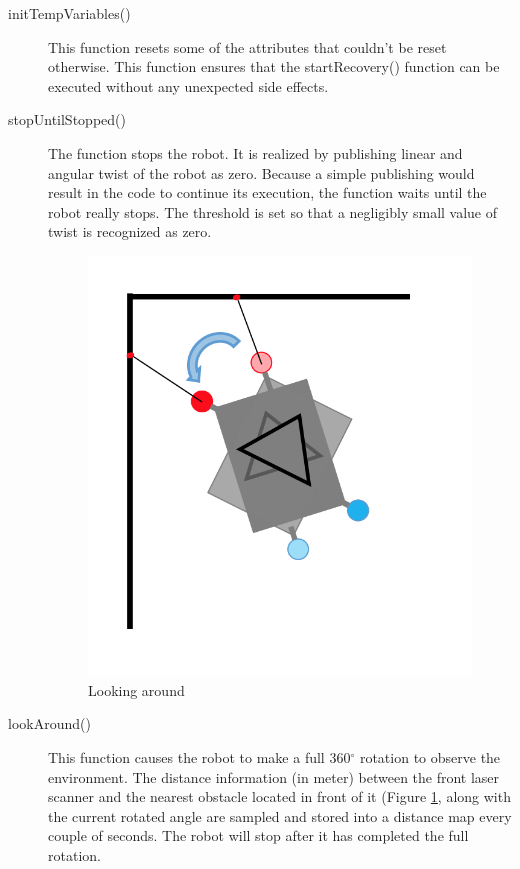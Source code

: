 \begin{description}
\item[initTempVariables()] 

This function resets some of the attributes that couldn't be reset otherwise. This function ensures that the startRecovery() function can be executed without any unexpected side effects.

\item[stopUntilStopped()] 

The function stops the robot. It is realized by publishing linear and angular twist of the robot as zero. Because a simple publishing would result in the code to continue its execution, the function waits until the robot really stops. The threshold is set so that a negligibly small value of twist is recognized as zero.

\begin{figure}[htb]
\centering
\includegraphics[scale=0.5]{graphics/find_best_angle.png}
\caption{Looking around}
\label{best}
\centering
\end{figure}

\item[lookAround()] 

This function causes the robot to make a full 360$^{\circ}$ rotation to observe the environment. The distance information (in meter) between the front laser scanner and the nearest obstacle located in front of it (Figure \ref{best}, along with the current rotated angle are sampled and stored into a distance map every couple of seconds. The robot will stop after it has completed the full rotation.


\end{description}
